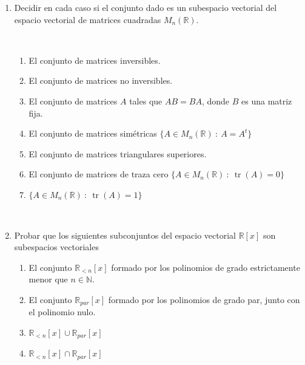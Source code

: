 \documentclass[12pt]{amsart}
\begin{document}
\begin{enumerate}
\

    \item Decidir en cada caso si el conjunto dado es un subespacio vectorial del espacio vectorial de matrices cuadradas $M_n(\mathbb{R})$.

\

\begin{enumerate}
	\item El conjunto de matrices  inversibles.
	\item El conjunto de matrices no inversibles.
	\item El conjunto de matrices $A$ tales que $AB = BA$, donde $B$ es una matriz fija.
	\item El conjunto de matrices sim\'etricas $\{A\in M_n(\mathbb{R})\ :\ A=A^t\}$
	\item El conjunto de matrices triangulares superiores.
	\item El conjunto de matrices de traza cero $\{A\in M_n(\mathbb{R})\ :\ \operatorname{tr}(A)=0\}$
	\item $\{A\in M_n(\mathbb{R})\ :\ \operatorname{tr}(A)=1\}$
\end{enumerate}

\
	
    \item Probar que los siguientes  subconjuntos del espacio vectorial $\mathbb{R}[x]$ son subespacios vectoriales
    
    \begin{enumerate}
     \item El conjunto $\mathbb{R}_{< n}[x]$ formado por los polinomios de grado estrictamente menor que $n\in\mathbb{N}$.
     
    \item El conjunto $\mathbb{R}_{par}[x]$ formado por los polinomios de grado par, junto
	con el polinomio nulo.
	
	\item $\mathbb{R}_{< n}[x]\cup \mathbb{R}_{par}[x]$

	\item $\mathbb{R}_{< n}[x]\cap \mathbb{R}_{par}[x]$
     \end{enumerate}

	
\


\end{enumerate}
\end{document}
